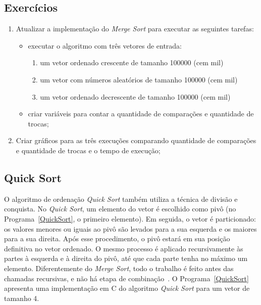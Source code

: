 \documentclass[11pt,fleqn]{book} %
\begin{document}
\subsection*{Exercícios}
\begin{enumerate}
	\item Atualizar a implementação do \textit{Merge Sort} para executar as seguintes tarefas:
	\begin{itemize}
		\item executar o algoritmo com três vetores de entrada:
		\begin{enumerate}
			\item um vetor ordenado crescente de tamanho 100000 (cem mil)
			\item um vetor com números aleatórios de tamanho 100000 (cem mil)
			\item um vetor ordenado decrescente de tamanho 100000 (cem mil)
		\end{enumerate} 
		\item criar variáveis para contar a quantidade de comparações e quantidade de trocas;
	\end{itemize} 
	\item Criar gráficos para as três execuções comparando quantidade de comparações e quantidade de trocas e o tempo de execução;
\end{enumerate} 


\newpage
\subsection*{Quick Sort}
O algoritmo de ordenação \textit{Quick Sort} também utiliza a técnica de divisão e conquista.
No \textit{Quick Sort}, um elemento do vetor é escolhido como pivô (no Programa~\ref{QuickSort}, o primeiro elemento).
Em seguida, o vetor é particionado: os valores menores ou iguais ao pivô são levados para a sua esquerda e os maiores para a sua direita.
Após esse procedimento, o pivô estará em sua posição definitiva no vetor ordenado.
O mesmo processo é aplicado recursivamente às partes à esquerda e à direita do pivô, até que cada parte tenha no máximo um elemento.
Diferentemente do \textit{Merge Sort}, todo o trabalho é feito antes das chamadas recursivas, e não há etapa de combinação~\cite{hoare1962}.
O Programa~\ref{QuickSort} apresenta uma implementação em C do algoritmo \textit{Quick Sort} para um vetor de tamanho 4.

\end{document}
